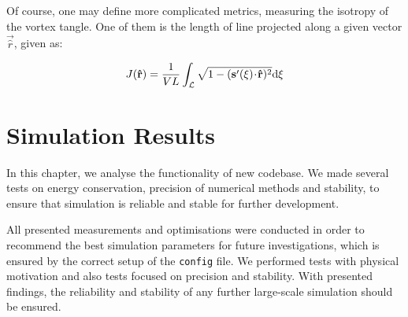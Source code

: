 Of course, one may define more complicated metrics, measuring the isotropy of the vortex tangle. One of them is the length of line projected along a given vector $\vec{\hat{r}}$, given as:

\begin{equation}
J(\mathbf{\hat{r}}) = \frac{1}{VL} \int_{\mathcal{L}} \sqrt{1 - (\mathbf{s}^{\prime}(\xi) \!\cdot\! \mathbf{\hat{r}})^2} \text{d}\xi
\end{equation}

\newpage

\chapter{Simulation Results}
%
%

In this chapter, we analyse the functionality of new codebase. We made several tests on energy conservation, precision of numerical methods and stability, to ensure that simulation is reliable and stable for further development.

All presented measurements and optimisations were conducted in order to recommend the best simulation parameters for future investigations, which is ensured by the correct setup of the \texttt{config} file. We performed tests with physical motivation and also tests focused on precision and stability. With presented findings, the reliability and stability of any further large-scale simulation should be ensured.

